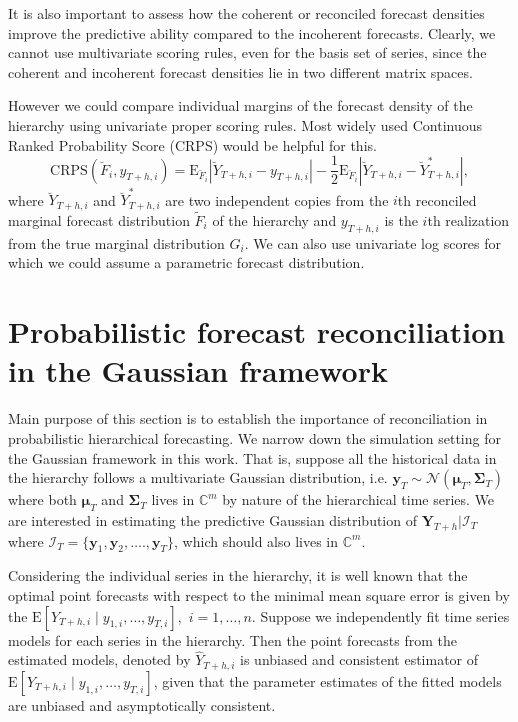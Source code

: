 \documentclass[a4paper, 11pt]{article}
\def\E{\text{E}}
\begin{document}
It is also important to assess how the coherent or reconciled forecast densities improve the predictive ability compared to the incoherent forecasts. Clearly, we cannot use multivariate scoring rules, even for the basis set of series, since the coherent and incoherent forecast densities lie in two different matrix spaces.

However we could compare individual margins of the forecast density of the hierarchy using univariate proper scoring rules. Most widely used Continuous Ranked Probability Score (CRPS) would be helpful for this.
\begin{equation} \label{eq:(3.6)}
\text{CRPS}(\breve{F}_i,y_{T+h,i}) = \E_{\breve{F}_i}|\breve{Y}_{T+h,i}-y_{T+h,i}| - \frac{1}{2}\E_{\breve{F}_i}|\breve{Y}_{T+h,i}-\breve{Y}^*_{T+h,i}|,
\end{equation}
where $\breve{Y}_{T+h,i}$ and $\breve{Y}^*_{T+h,i}$ are two independent copies from the $i$th reconciled marginal forecast distribution $\tilde{F}_i$ of the hierarchy and $y_{T+h,i}$ is the $i$th realization from the true marginal distribution $G_i$. We can also use univariate log scores for which we could assume a parametric forecast distribution.

\section{Probabilistic forecast reconciliation in the Gaussian framework}\label{sec:gaussian}

Main purpose of this section is to establish the importance of reconciliation in probabilistic hierarchical forecasting. We narrow down the simulation setting for the Gaussian framework in this work. That is, suppose all the historical data in the hierarchy follows a multivariate Gaussian distribution, i.e. $\bm{y}_T \sim \mathscr{N}(\bm{\mu}_T, \bm{\Sigma}_T)$ where both $\bm{\mu}_T$ and $\bm{\Sigma}_T$ lives in $\mathbb{C}^m$ by nature of the hierarchical time series. We are interested in estimating the predictive Gaussian distribution of $\bm{Y}_{T+h}| \bm{\mathcal{I}}_T$ where $\bm{\mathcal{I}}_T= \{\bm{y}_1,\bm{y}_2,\dots.,\bm{y}_T\}$, which should also lives in $\mathbb{C}^m$.

Considering the individual series in the hierarchy, it is well known that the optimal point forecasts with respect to the minimal mean square error is given by the $\E[Y_{T+h,i}\mid y_{1,i},\dots,y_{T,i}],$ $i=1,\dots,n$. Suppose we independently fit time series models for each series in the hierarchy. Then the point forecasts from the estimated models, denoted by $\hat{Y}_{T+h,i}$ is unbiased and consistent estimator of $\E[Y_{T+h,i}\mid y_{1,i},\dots,y_{T,i}]$, given that the parameter estimates of the fitted models are unbiased and asymptotically consistent.
\end{document}
